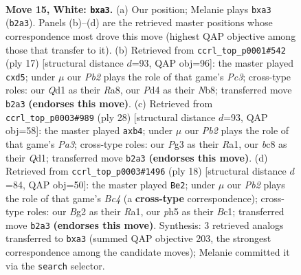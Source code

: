 \documentclass[11pt]{article}
\begin{document}
\clearpage

\begin{figure}[p]\centering
\begin{subfigure}{0.46\textwidth}\centering
\resizebox{\linewidth}{!}{%
\newchessgame
\chessboard[
  setfen={r1b1k2r/2p1qp2/2n2np1/p2p3p/3P4/p1B2NP1/1P2PPBP/R2QR1K1 w kq - 0 15},
  showmover=false,
  pgfstyle=straightmove, color=movearrow, markmove={b2-a3}
]}
\caption{}
\end{subfigure}\hfill
\begin{subfigure}{0.46\textwidth}\centering
\resizebox{\linewidth}{!}{%
\newchessgame
\chessboard[
  setfen={rnbq1rk1/pp2bppp/2p2n2/3P4/2BN1B2/P1N5/1PP2PPP/R2QK2R b KQ - 0 9},
  showmover=false,
  pgfstyle=straightmove, color=movearrow, markmove={c6-d5}
]}
\caption{}
\end{subfigure}
\\[4pt]
\begin{subfigure}{0.46\textwidth}\centering
\resizebox{\linewidth}{!}{%
\newchessgame
\chessboard[
  setfen={r1b1k2r/1pb1qpp1/2n1p2p/8/1pPpN3/P2P1NP1/5PBP/R2Q1RK1 w kq - 0 15},
  showmover=false,
  pgfstyle=straightmove, color=movearrow, markmove={a3-b4}
]}
\caption{}
\end{subfigure}\hfill
\begin{subfigure}{0.46\textwidth}\centering
\resizebox{\linewidth}{!}{%
\newchessgame
\chessboard[
  setfen={rnbqk2r/5ppp/p3pn2/1p6/1bBP4/2N2N1P/PP3PP1/R1BQ1RK1 w kq - 0 10},
  showmover=false,
  pgfstyle=straightmove, color=movearrow, markmove={c4-e2}
]}
\caption{}
\end{subfigure}
\caption{\textbf{Move 15, White: \texttt{bxa3}.} (a) Our position; Melanie plays \texttt{bxa3} (\texttt{b2a3}). Panels (b)--(d) are the retrieved master positions whose correspondence most drove this move (highest QAP objective among those that transfer to it). (b) Retrieved from \texttt{ccrl\_top\_p0001\#542} (ply 17) [structural distance $d$=93, QAP obj=96]: the master played \texttt{cxd5}; under $\mu$ our \emph{Pb2} plays the role of that game's \emph{Pc3}; cross-type roles: our \emph{Q}d1 as their \emph{R}a8, our \emph{P}d4 as their \emph{N}b8; transferred move \texttt{b2a3} \textbf{(endorses this move)}. (c) Retrieved from \texttt{ccrl\_top\_p0003\#989} (ply 28) [structural distance $d$=93, QAP obj=58]: the master played \texttt{axb4}; under $\mu$ our \emph{Pb2} plays the role of that game's \emph{Pa3}; cross-type roles: our \emph{P}g3 as their \emph{R}a1, our \emph{b}c8 as their \emph{Q}d1; transferred move \texttt{b2a3} \textbf{(endorses this move)}. (d) Retrieved from \texttt{ccrl\_top\_p0003\#1496} (ply 18) [structural distance $d$=84, QAP obj=50]: the master played \texttt{Be2}; under $\mu$ our \emph{Pb2} plays the role of that game's \emph{Bc4} (a \textbf{cross-type} correspondence); cross-type roles: our \emph{B}g2 as their \emph{R}a1, our \emph{p}h5 as their \emph{B}c1; transferred move \texttt{b2a3} \textbf{(endorses this move)}. Synthesis: 3 retrieved analogs transferred to \texttt{bxa3} (summed QAP objective 203, the strongest correspondence among the candidate moves); Melanie committed it via the \texttt{search} selector.}
\label{fig:thought-m28}
\end{figure}
\end{document}
